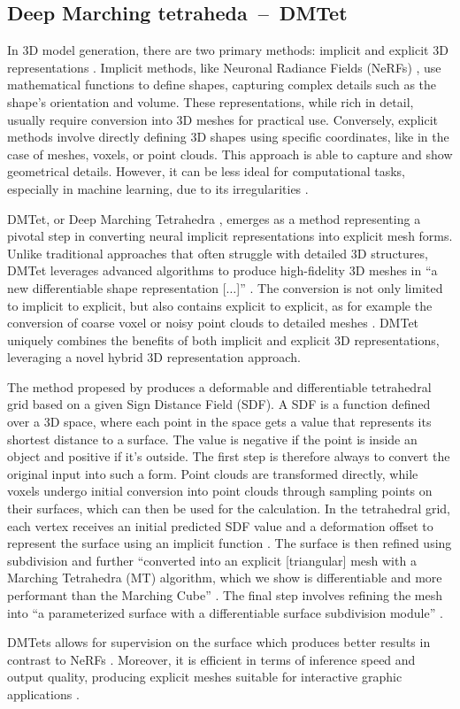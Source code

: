 \subsection{Deep Marching tetraheda~--~DMTet}\label{DMTet}

In 3D model generation, there are two primary methods: implicit and explicit 3D representations \citep{shen2021DMTet}. Implicit methods, like Neuronal Radiance Fields (NeRFs) \citep{mildenhallNERF}, use mathematical functions to define shapes, capturing complex details such as the shape's orientation and volume. These representations, while rich in detail, usually require conversion into 3D meshes for practical use. Conversely, explicit methods involve directly defining 3D shapes using specific coordinates, like in the case of meshes, voxels, or point clouds. This approach is able to capture and show geometrical details. However, it can be less ideal for computational tasks, especially in machine learning, due to its irregularities \citep{michalkiewicz2019deep}.

DMTet, or Deep Marching Tetrahedra \citep{shen2021DMTet}, emerges as a method representing a pivotal step in converting neural implicit representations into explicit mesh forms. Unlike traditional approaches that often struggle with detailed 3D structures, DMTet leverages advanced algorithms to produce high-fidelity 3D meshes in ``a new differentiable shape representation [\(\ldots\)]'' \citep{shen2021DMTet}. The conversion is not only limited to implicit to explicit, but also contains explicit to explicit, as for example the conversion of coarse voxel or noisy point clouds to detailed meshes \citep{shen2021DMTet}. DMTet uniquely combines the benefits of both implicit and explicit 3D representations, leveraging a novel hybrid 3D representation approach.

The method propesed by \citeauthor{shen2021DMTet} produces a deformable and differentiable tetrahedral grid based on a given Sign Distance Field (SDF). A SDF is a function defined over a 3D space, where each point in the space gets a value that represents its shortest distance to a surface. The value is negative if the point is inside an object and positive if it's outside. The first step is therefore always to convert the original input into such a form. Point clouds are transformed directly, while voxels undergo initial conversion into point clouds through sampling points on their surfaces, which can then be used for the calculation. In the tetrahedral grid, each vertex receives an initial predicted SDF value and a deformation offset to represent the surface using an implicit function \citep{shen2021DMTet}. The surface is then refined using subdivision and further ``converted into an explicit [triangular] mesh with a Marching Tetrahedra (MT) algorithm, which we show is differentiable and more performant than the Marching Cube'' \citep{shen2021DMTet}. The final step involves refining the mesh into ``a parameterized surface with a differentiable surface subdivision module'' \citep{shen2021DMTet}.

DMTets allows for supervision on the surface which produces better results in contrast to NeRFs \citep{shen2021DMTet}. Moreover, it is efficient in terms of inference speed and output quality, producing explicit meshes suitable for interactive graphic applications \citep{shen2021DMTet}.